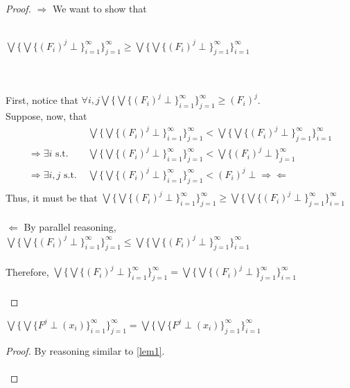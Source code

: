  \begin{proof}
 $\Rightarrow$ We want to show that\\ \\ \centerline{$\bigvee\{\bigvee\{(F_i)^j \perp\}^{\infty}_{i=1}\}^{\infty}
 _{j=1} \geq  \bigvee\{\bigvee\{(F_i)^j \perp\}^{\infty}_{j=1}\}^{\infty}_{i=1}$} \\ \\ First, notice that $\forall i, j \bigvee\{\bigvee
 \{(F_i)^j \perp\}^{\infty}_{i=1}\}^{\infty}_{j=1} \geq (F_i)^j$. \\
 Suppose, now, that 
 \begin{align*}
 &\bigvee\{\bigvee\{(F_i)^j \perp\}^{\infty}_{i=1}\}^{\infty}_{j=1} < \bigvee\{\bigvee\{(F_i)^j \perp\}^{\infty}_{j=1}\}^{\infty}_{i=1}\\ 
 \Rightarrow \exists i \text{ s.t. \ \  \ } &\bigvee\{\bigvee\{(F_i)^j \perp\}^{\infty}_{i=1}\}^{\infty}_{j=1} < \bigvee\{(F_i)^j \perp\}
 ^{\infty}_{j=1}\\
 \Rightarrow \exists i, j \text{ s.t. } &\bigvee\{\bigvee\{(F_i)^j \perp\}^{\infty}_{i=1}\}^{\infty}_{j=1} < (F_i)^j \perp 
 \Rightarrow\Leftarrow\\
 \end{align*}
 Thus, it must be that $\bigvee\{\bigvee\{(F_i)^j \perp\}^{\infty}_{i=1}\}^{\infty}_{j=1} \geq  \bigvee\{\bigvee\{(F_i)^j \perp\}^{\infty}
 _{j=1}\}^{\infty}_{i=1}$ \\ \\
 $\Leftarrow$ By parallel reasoning, $\bigvee\{\bigvee\{(F_i)^j \perp\}^{\infty}_{i=1}\}^{\infty}_{j=1} \leq  \bigvee\{\bigvee\{(F_i)^j 
 \perp\}^{\infty}_{j=1}\}^{\infty}_{i=1}$ \\ \\
 Therefore, $\bigvee\{\bigvee\{(F_i)^j \perp\}^{\infty}_{i=1}\}^{\infty}_{j=1} = \bigvee\{\bigvee\{(F_i)^j \perp\}^{\infty}_{j=1}\}
 ^{\infty}_{i=1}$ \\ \\
 \end{proof}
 \begin{lemma}
 \label{lem2}
 $\bigvee\{\bigvee\{F^j \perp(x_i)\}^{\infty}_{i=1}\}^{\infty}_{j=1} = \bigvee\{\bigvee\{F^j \perp(x_i)\}^{\infty}
 _{j=1}\}^{\infty}_{i=1}$\\ 
 \end{lemma}
 \begin{proof} 
 By reasoning similar to \ref{lem1}. \\ \\
 \end{proof}
 
